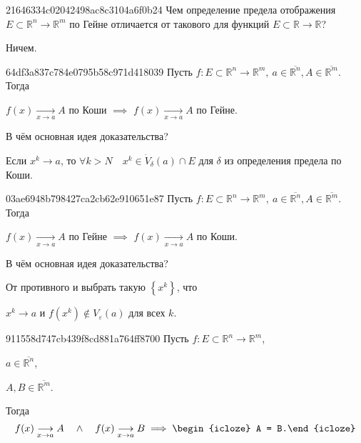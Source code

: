 \begin{note}{21646334c02042498ac8c3104a6f0b24}
    Чем определение предела отображения \({ E \subset \mathbb R^{n} \to \mathbb R^{m} }\) по Гейне отличается от такового для функций \({ E \subset \mathbb R \to \mathbb R }\)?

    \begin{cloze}{1}
        Ничем.
    \end{cloze}
\end{note}

\begin{note}{64df3a837c784e0795b58c971d418039}
    Пусть \({ f : E \subset \mathbb R^{n} \to \mathbb R^{m},\: a \in \overline{\mathbb R^{n}}, A \in \overline{\mathbb R^{m}} }\).
    Тогда
    \begin{center}
        \({ f(x) \underset{x \to a}\longrightarrow A }\) по Коши
        \({ \implies }\)
        \({ f(x) \underset{x \to a}\longrightarrow A }\) по Гейне.
    \end{center}
    В чём основная идея доказательства?

    \begin{cloze}{1}
        Если \({ x^{k} \to a }\), то \({ \forall k > N \quad x^{k} \in \dot V_{\delta}(a) \cap E }\) для \({ \delta }\) из определения предела по Коши.
    \end{cloze}
\end{note}

\begin{note}{03ae6948b798427ca2cb62e910651e87}
    Пусть \({ f : E \subset \mathbb R^{n} \to \mathbb R^{m},\: a \in \overline{\mathbb R^{n}}, A \in \overline{\mathbb R^{m}} }\).
    Тогда
    \begin{center}
        \({ f(x) \underset{x \to a}\longrightarrow A }\) по Гейне
        \({ \implies }\)
        \({ f(x) \underset{x \to a}\longrightarrow A }\) по Коши.
    \end{center}
    В чём основная идея доказательства?

    \begin{cloze}{1}
        От противного и выбрать такую \({ \left\{ x^{k} \right\} }\), что
        \begin{center}
            \({ x^{k} \to a }\) \quad и \quad \({ f(x^{k}) \not\in V_{\varepsilon}(a) }\) для всех \({ k }\).
        \end{center}
    \end{cloze}
\end{note}

\begin{note}{911558d747cb439f8cd881a764ff8700}
    Пусть \({ f : E \subset \mathbb R^{n} \to \mathbb R^{m} }\),\: \begin{icloze}{3}\({ a \in \overline{\mathbb R^{n}} }\),\end{icloze}\: \begin{icloze}{2}\({ A, B \in \overline{\mathbb R^{m}} }\).\end{icloze}
    Тогда
    \[
        f(x) \underset{x \to a}\longrightarrow A \quad \land \quad f(x) \underset{x \to a}\longrightarrow B \implies \begin{icloze}{1}A = B.\end{icloze}
    \]
\end{note}

